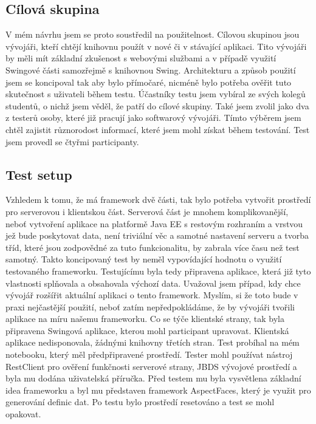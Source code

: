 \subsection{Cílová skupina}
V mém návrhu jsem se proto soustředil na použitelnost. Cílovou skupinou jsou vývojáři, kteří chtějí knihovnu použít v nové či v stávající aplikaci. Tito vývojáři by měli mít základní zkušenost s webovými službami a v případě využití Swingové části samozřejmě s knihovnou Swing. Architekturu a způsob použití jsem se koncipoval tak aby bylo přímočaré, nicméně bylo potřeba ověřit tuto skutečnost s uživateli během testu. Účastníky testu jsem vybíral ze svých kolegů studentů, o nichž jsem věděl, že patří do cílové skupiny. Také jsem zvolil jako dva z testerů osoby, které již pracují jako softwarový vývojáři. Tímto výběrem jsem chtěl zajistit různorodost informací, které jsem mohl získat během testování. Test jsem provedl se čtyřmi participanty.

\subsection{Test setup}
Vzhledem k tomu, že má framework dvě části, tak bylo potřeba vytvořit prostředí pro serverovou i klientskou část. Serverová část je mnohem komplikovanější, neboť vytvoření aplikace na platformě Java EE s restovým rozhraním a vrstvou jež bude poskytovat data, není triviální věc a samotné nastavení serveru a tvorba tříd, které jsou zodpovědné za tuto funkcionalitu, by zabrala více času než test samotný. Takto koncipovaný test by neměl vypovídající hodnotu o využití testovaného frameworku. Testujícímu byla tedy připravena aplikace, která již tyto vlastnosti splňovala a obsahovala výchozí data. Uvažoval jsem případ, kdy chce vývojář rozšířit aktuální aplikaci o tento framework. Myslím, si že toto bude v praxi nejčastější použití, neboť zatím nepředpokládáme, že by vývojáři tvořili aplikace na míru našemu frameworku. Co se týče klientské strany, tak byla připravena Swingová aplikace, kterou mohl participant upravovat. Klientská aplikace nedisponovala, žádnými knihovny třetích stran. Test probíhal na mém notebooku, který měl předpřipravené prostředí. Tester mohl používat nástroj RestClient pro ověření funkčnosti serverové strany, JBDS vývojové prostředí a byla mu dodána uživatelská příručka. Před testem mu byla vysvětlena základní idea frameworku a byl mu představen framework AspectFaces, který je využit pro generování definic dat. Po testu bylo prostředí resetováno a test se mohl opakovat.

